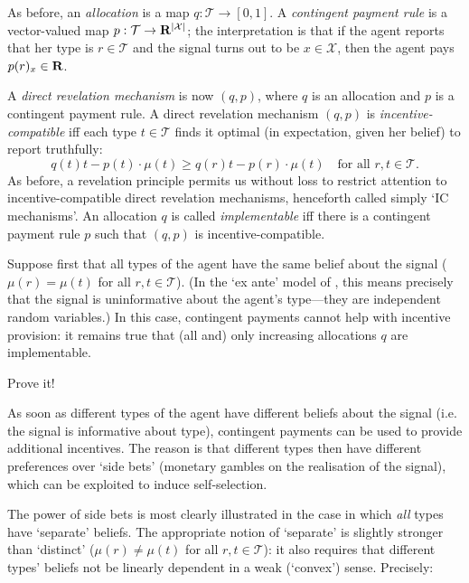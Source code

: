 As before, an \emph{allocation} is a map $q : \mathcal{T} \to [0,1]$.
A \emph{contingent payment rule} is a vector-valued map $p : \mathcal{T} \to \R^{\abs*{\mathcal{X}}}$;
the interpretation is that if the agent reports that her type is $r \in \mathcal{T}$ and the signal turns out to be $x \in \mathcal{X}$,
then the agent pays $p(r)_x \in \mathbf{R}$.

A \emph{direct revelation mechanism} is now $(q,p)$,
where $q$ is an allocation
and $p$ is a contingent payment rule.
A direct revelation mechanism $(q,p)$ is \emph{incentive-compatible} iff each type $t \in \mathcal{T}$ finds it optimal (in expectation, given her belief) to report truthfully:
%
\begin{equation*}
	q(t) t - p(t) \cdot \mu(t)
	\geq q(r) t - p(r) \cdot \mu(t)
	\quad \text{for all $r,t \in \mathcal{T}$.}
\end{equation*}
%
As before, a revelation principle permits us without loss to restrict attention to incentive-compatible direct revelation mechanisms, henceforth called simply `IC mechanisms'.
An allocation $q$ is called \emph{implementable} iff there is a contingent payment rule $p$ such that $(q,p)$ is incentive-compatible.

Suppose first that all types of the agent have the same belief about the signal ($\mu(r) = \mu(t)$ for all $r,t \in \mathcal{T}$).
(In the `ex ante' model of , this means precisely that the signal is uninformative about the agent's type---they are independent random variables.)
In this case, contingent payments cannot help with incentive provision:
it remains true that (all and) only increasing allocations $q$ are implementable.

\begin{exercise}
	\label{exercise:cremer-mclean_samebelief}
	Prove it!
\end{exercise}

As soon as different types of the agent have different beliefs about the signal
(i.e. the signal is informative about type),
contingent payments can be used to provide additional incentives.
The reason is that different types then have different preferences over `side bets' (monetary gambles on the realisation of the signal),
which can be exploited to induce self-selection.

The power of side bets is most clearly illustrated
in the case in which \emph{all} types have `separate' beliefs.
The appropriate notion of `separate' is slightly stronger than `distinct' ($\mu(r) \neq \mu(t)$ for all $r,t \in \mathcal{T}$):
it also requires that different types' beliefs not be linearly dependent in a weak (`convex') sense.
Precisely:

